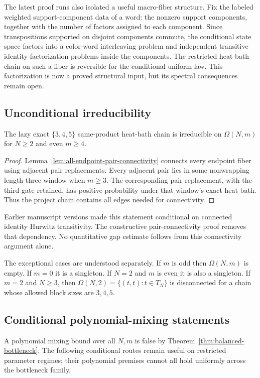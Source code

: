 The latest proof runs also isolated a useful macro-fiber structure.  Fix the
labeled weighted support-component data of a word: the nonzero support
components, together with the number of factors assigned to each component.
Since transpositions supported on disjoint components commute, the conditional
state space factors into a color-word interleaving problem and independent
transitive identity-factorization problems inside the components.  The
restricted heat-bath chain on such a fiber is reversible for the conditional
uniform law.  This factorization is now a proved structural input, but its
spectral consequences remain open.

\subsection{Unconditional irreducibility}

\begin{proposition}[Irreducibility]
The lazy exact $\{3,4,5\}$ same-product heat-bath chain is irreducible
on $\Omega(N,m)$ for $N\ge2$ and even $m\ge4$.
\end{proposition}
\begin{proof}
Lemma~\ref{lem:all-endpoint-pair-connectivity} connects every endpoint
fiber using adjacent pair replacements.  Every adjacent pair lies in
some nonwrapping length-three window when $m\ge3$.  The corresponding
pair replacement, with the third gate retained, has positive probability
under that window's exact heat bath.  Thus the project chain contains all
edges needed for connectivity.
\end{proof}

Earlier manuscript versions made this statement conditional on connected
identity Hurwitz transitivity.  The constructive pair-connectivity proof
removes that dependency.  No quantitative gap estimate follows from this
connectivity argument alone.

The exceptional cases are understood separately.  If $m$ is odd then
$\Omega(N,m)$ is empty.  If $m=0$ it is a singleton.  If $N=2$ and $m$ is even
it is also a singleton.  If $m=2$ and $N\ge 3$, then
$\Omega(N,2)=\{(t,t):t\in T_N\}$ is disconnected for a chain whose allowed
block sizes are $3,4,5$.

\subsection{Conditional polynomial-mixing statements}

A polynomial mixing bound over all $N,m$ is false by
Theorem~\ref{thm:balanced-bottleneck}. The following conditional routes
remain useful on restricted parameter regimes; their polynomial premises
cannot all hold uniformly across the bottleneck family.

